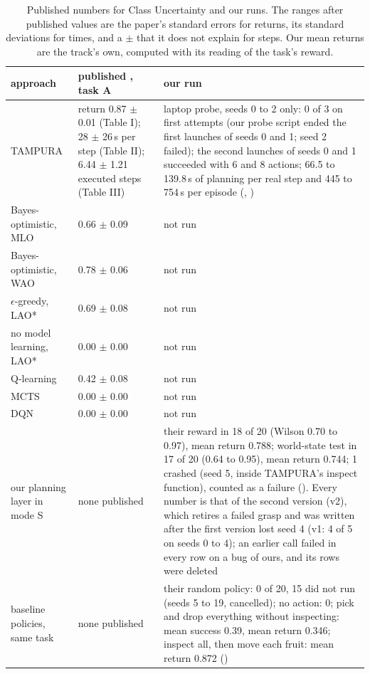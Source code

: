 \begin{table}[tbp]
\centering
\small
\begin{tabularx}{\textwidth}{@{}P{3.1cm}YY@{}}
\toprule
approach & published \cite{curtis2024partially}, task A & our run \\
\midrule
TAMPURA &
return 0.87 $\pm$ 0.01 (Table I); 28 $\pm$ 26\,s per step (Table II); 6.44
$\pm$ 1.21 executed steps (Table III) &
laptop probe, seeds 0 to 2 only: 0 of 3 on first attempts (our probe script ended
the first launches of seeds 0 and 1; seed 2 failed); the second launches of seeds 0
and 1 succeeded with 6 and 8 actions; 66.5 to 139.8\,s of planning per real step and
445 to 754\,s per episode (, ) \\
Bayes-optimistic, MLO &  0.66 $\pm$ 0.09 & not run \\
Bayes-optimistic, WAO &  0.78 $\pm$ 0.06 & not run \\
$\epsilon$-greedy, LAO* & 0.69 $\pm$ 0.08 & not run \\
no model learning, LAO* & 0.00 $\pm$ 0.00 & not run \\
Q-learning & 0.42 $\pm$ 0.08 & not run \\
MCTS & 0.00 $\pm$ 0.00 & not run \\
DQN & 0.00 $\pm$ 0.00 & not run \\
our planning layer in mode S &
none published &
their reward in 18 of 20 (Wilson 0.70 to 0.97), mean return 0.788; world-state
test in 17 of 20 (0.64 to 0.95), mean return 0.744; 1 crashed (seed 5, inside
TAMPURA's inspect function), counted as a failure (). Every number is that of
the second version (v2), which retires a failed grasp and was written after the first
version lost seed 4 (v1: 4 of 5 on seeds 0 to 4); an earlier call failed in every row on
a bug of ours, and its rows were deleted \\
baseline policies, same task &
none published &
their random policy: 0 of 20, 15 did not run (seeds 5 to 19, cancelled); no action: 0; pick and drop
everything without inspecting: mean success 0.39, mean return 0.346; inspect all,
then move each fruit: mean return 0.872 () \\
\bottomrule
\end{tabularx}
\caption[Published numbers for Class Uncertainty and our runs.]{Published numbers
for Class Uncertainty and our runs. The ranges after
published values are the paper's standard errors for returns, its standard
deviations for times, and a $\pm$ that it does not explain for steps. Our mean returns are the track's own, computed
with its reading of the task's reward.}
\label{tab:published-cu}
\end{table}

